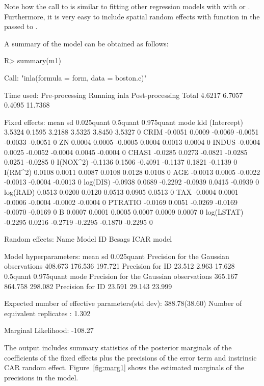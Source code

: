\documentclass[article]{jss}
\begin{document}
Note how the call to  is similar to fitting other regression
models with  with  or . Furthermore, 
it is very easy to include spatial random effects with function 
in the  passed to .


A summary of the model can be obtained as
follows:

\begin{Schunk}
\begin{Sinput}
R> summary(m1)
\end{Sinput}
\begin{Soutput}
Call:
"inla(formula = form, data = boston.c)"

Time used:
 Pre-processing    Running inla Post-processing           Total 
         4.6217          6.7057          0.4095         11.7368 

Fixed effects:
               mean     sd 0.025quant 0.5quant 0.975quant    mode kld
(Intercept)  3.5324 0.1595     3.2188   3.5325     3.8450  3.5327   0
CRIM        -0.0051 0.0009    -0.0069  -0.0051    -0.0033 -0.0051   0
ZN           0.0004 0.0005    -0.0005   0.0004     0.0013  0.0004   0
INDUS       -0.0004 0.0025    -0.0052  -0.0004     0.0045 -0.0004   0
CHAS1       -0.0285 0.0273    -0.0821  -0.0285     0.0251 -0.0285   0
I(NOX^2)    -0.1136 0.1506    -0.4091  -0.1137     0.1821 -0.1139   0
I(RM^2)      0.0108 0.0011     0.0087   0.0108     0.0128  0.0108   0
AGE         -0.0013 0.0005    -0.0022  -0.0013    -0.0004 -0.0013   0
log(DIS)    -0.0938 0.0689    -0.2292  -0.0939     0.0415 -0.0939   0
log(RAD)     0.0513 0.0200     0.0120   0.0513     0.0905  0.0513   0
TAX         -0.0004 0.0001    -0.0006  -0.0004    -0.0002 -0.0004   0
PTRATIO     -0.0169 0.0051    -0.0269  -0.0169    -0.0070 -0.0169   0
B            0.0007 0.0001     0.0005   0.0007     0.0009  0.0007   0
log(LSTAT)  -0.2295 0.0216    -0.2719  -0.2295    -0.1870 -0.2295   0

Random effects:
Name	  Model
 ID   Besags ICAR model 

Model hyperparameters:
                                        mean    sd      0.025quant
Precision for the Gaussian observations 408.673 176.536 197.721   
Precision for ID                         23.512   2.963  17.628   
                                        0.5quant 0.975quant mode   
Precision for the Gaussian observations 365.167  864.758    298.082
Precision for ID                         23.591   29.143     23.999

Expected number of effective parameters(std dev): 388.78(38.60)
Number of equivalent replicates : 1.302 

Marginal Likelihood:  -108.27 
\end{Soutput}
\end{Schunk}
\noindent
The output includes summary statistics of the posterior marginals of the
coefficients of the fixed effects plus the precisions of the error term and
instrinsic CAR random effect. Figure~\ref{fig:marg1} shows the estimated
marginals of the precisions in the model.
\end{document}
